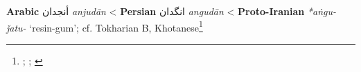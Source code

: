 \begin{etymology}\label{ety:anjudan}
\textbf{Arabic} {أنجدان} \textit{anjudān}
< \textbf{Persian} {انگدان} \textit{angudān}
< \textbf{Proto-Iranian} \textit{*aṅgu-ǰatu-} `resin-gum'; cf. Tokharian B, Khotanese\footnote{\textcite[79-80]{lane_arabic-english_1863}; \textcite[114, 106]{steingass_comprehensive_1892}; \textcite[7]{adams_dictionary_2013}}
\end{etymology}